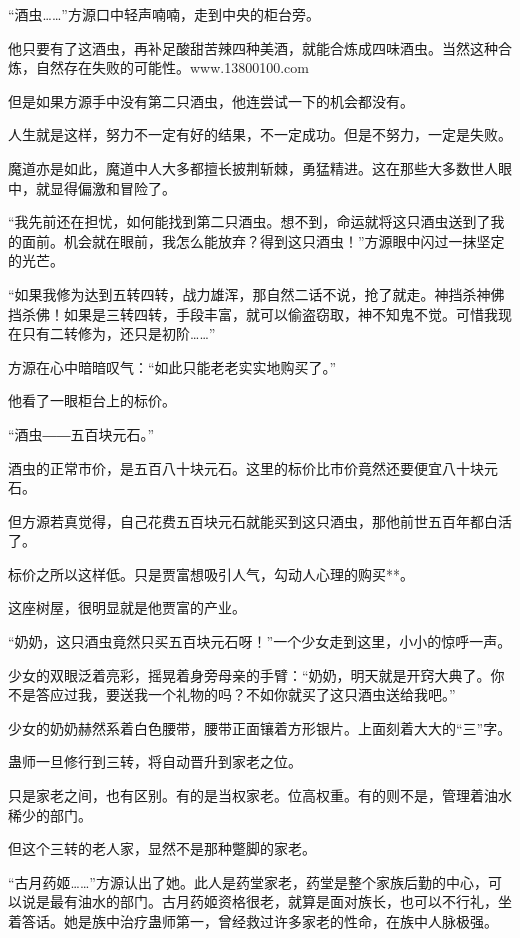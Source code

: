 
\begin{this_body}

“酒虫……”方源口中轻声喃喃，走到中央的柜台旁。

他只要有了这酒虫，再补足酸甜苦辣四种美酒，就能合炼成四味酒虫。当然这种合炼，自然存在失败的可能性。www.13800100.com

但是如果方源手中没有第二只酒虫，他连尝试一下的机会都没有。

人生就是这样，努力不一定有好的结果，不一定成功。但是不努力，一定是失败。

魔道亦是如此，魔道中人大多都擅长披荆斩棘，勇猛精进。这在那些大多数世人眼中，就显得偏激和冒险了。

“我先前还在担忧，如何能找到第二只酒虫。想不到，命运就将这只酒虫送到了我的面前。机会就在眼前，我怎么能放弃？得到这只酒虫！”方源眼中闪过一抹坚定的光芒。

“如果我修为达到五转四转，战力雄浑，那自然二话不说，抢了就走。神挡杀神佛挡杀佛！如果是三转四转，手段丰富，就可以偷盗窃取，神不知鬼不觉。可惜我现在只有二转修为，还只是初阶……”

方源在心中暗暗叹气：“如此只能老老实实地购买了。”

他看了一眼柜台上的标价。

“酒虫――五百块元石。”

酒虫的正常市价，是五百八十块元石。这里的标价比市价竟然还要便宜八十块元石。

但方源若真觉得，自己花费五百块元石就能买到这只酒虫，那他前世五百年都白活了。

标价之所以这样低。只是贾富想吸引人气，勾动人心理的购买**。

这座树屋，很明显就是他贾富的产业。

“奶奶，这只酒虫竟然只买五百块元石呀！”一个少女走到这里，小小的惊呼一声。

少女的双眼泛着亮彩，摇晃着身旁母亲的手臂：“奶奶，明天就是开窍大典了。你不是答应过我，要送我一个礼物的吗？不如你就买了这只酒虫送给我吧。”

少女的奶奶赫然系着白色腰带，腰带正面镶着方形银片。上面刻着大大的“三”字。

蛊师一旦修行到三转，将自动晋升到家老之位。

只是家老之间，也有区别。有的是当权家老。位高权重。有的则不是，管理着油水稀少的部门。

但这个三转的老人家，显然不是那种蹩脚的家老。

“古月药姬……”方源认出了她。此人是药堂家老，药堂是整个家族后勤的中心，可以说是最有油水的部门。古月药姬资格很老，就算是面对族长，也可以不行礼，坐着答话。她是族中治疗蛊师第一，曾经救过许多家老的性命，在族中人脉极强。


\end{this_body}
